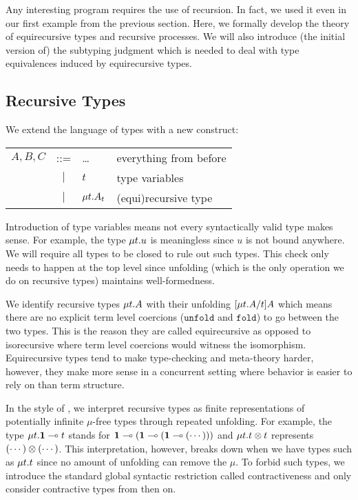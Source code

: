 \documentclass[a4paper,USenglish]{lipics-v2016}
\begin{document}
Any interesting program requires the use of recursion. In fact, we used it even in our first example from the previous section. Here, we formally develop the theory of equirecursive types and recursive processes. We will also introduce (the initial version of) the subtyping judgment which is needed to deal with type equivalences induced by equirecursive types.

\subsection{Recursive Types}

We extend the language of types with a new construct:
\begin{center}
\begin{tabular}{l c l l}
  $A, B, C$ & ::= & \ldots               & everything from before \\
            & $|$ & $t$                  & type variables \\
            & $|$ & $\mu{t} . {A_t}$ & (equi)recursive type
\end{tabular}
\end{center}

Introduction of type variables means not every syntactically valid type makes sense. For example, the type $\mu{t} . {u}$ is meaningless since $u$ is not bound anywhere. We will require all types to be closed to rule out such types. This check only needs to happen at the top level since unfolding (which is the only operation we do on recursive types) maintains well-formedness.

We identify recursive types $\mu{t} . {A}$ with their unfolding $\lbrack{\mu{t} . {A}}/{t}\rbrack{A}$ which means there are no explicit term level coercions ($\mathtt{unfold}$ and $\mathtt{fold}$) to go between the two types. This is the reason they are called equirecursive as opposed to isorecursive where term level coercions would witness the isomorphism. Equirecursive types tend to make type-checking and meta-theory harder, however, they make more sense in a concurrent setting where behavior is easier to rely on than term structure. 

In the style of \cite{AmadioC91}, we interpret recursive types as finite representations of potentially infinite $\mu$-free types through repeated unfolding. For example, the type $\mu{t} . {\mathbf{1} \multimap t}$ stands for $\mathbf{1} \multimap (\mathbf{1} \multimap (\mathbf{1} \multimap (\cdots )))$ and $\mu{t} . {t \otimes t}$ represents $(\cdots) \otimes (\cdots)$. This interpretation, however, breaks down when we have types such as $\mu{t} . {t}$ since no amount of unfolding can remove the $\mu$. To forbid such types, we introduce the standard global syntactic restriction called contractiveness and only consider contractive types from then on.
\end{document}
